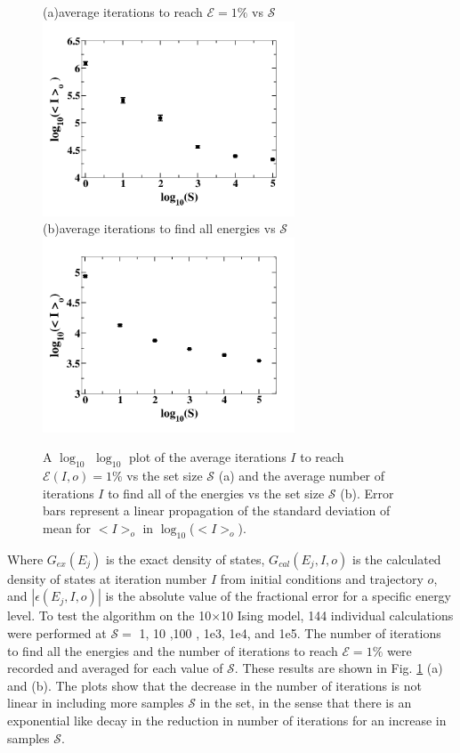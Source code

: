 \documentclass[aps,prl,reprint,superscriptaddress,showkeys]{revtex4-1}
\begin{document}
\begin{figure}[h!]
(a)\hspace{0.1cm}average iterations to reach $\mathcal{E}=1\%$ vs $\mathcal{S}$\\
\includegraphics[width=7.5cm]{Fig1a.png}\\
(b)\hspace{0.1cm}average iterations to find all energies vs $\mathcal{S}$\\
\includegraphics[width=7.5cm]{Fig1b.png}
\caption{\label{its_to}A $\log_{10}$ $\log_{10}$  plot of the average iterations $I$ to reach $\mathcal{E}(I,o)=1\%$ vs the set size $\mathcal{S}$ (a) and the average number of iterations $I$ to find all of the energies vs the set size $\mathcal{S}$ (b). Error bars represent a linear propagation of the standard deviation of mean for $<I>_o$ in $\log_{10}$($<I>_o$). }
\end{figure}
Where $G_{ex}(E_j)$ is the exact density of states, $G_{cal}(E_j,I,o)$ is the calculated density of states  at iteration number $I$ from initial conditions and trajectory $o$, and $|\epsilon(E_j,I,o)|$ is the absolute value of the fractional error for a specific energy level. To test the algorithm on the 10$\times$10 Ising model, 144 individual calculations were performed at  $\mathcal{S}=$ 1, 10 ,100 , 1e3,  1e4, and 1e5. The number of iterations to find all the energies and the number of iterations to  reach $\mathcal{E}=1\%$ were recorded and averaged for each value of $\mathcal{S}$. These results are shown in Fig. \ref{its_to}  (a) and (b).  The plots show that the decrease in the number of iterations is not linear in including more samples $\mathcal{S}$ in the set, in the sense that there is an exponential like decay in the reduction in number of  iterations for an increase in samples $\mathcal{S}$.  
\end{document}
